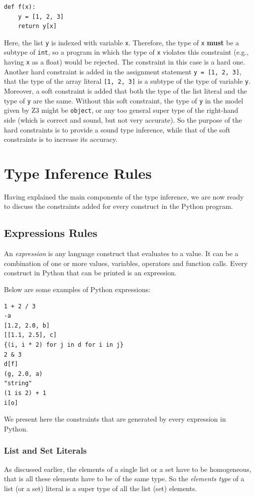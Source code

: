 \begin{lstlisting}
def f(x):
	y = [1, 2, 3]
	return y[x]
\end{lstlisting}

Here, the list \lstinline|y| is indexed with variable \lstinline|x|. Therefore, the type of \lstinline|x| \textbf{must} be a subtype of \lstinline|int|, so a program in which the type of \lstinline|x| violates this constraint (e.g., having \lstinline|x| as a float) would be rejected. The constraint in this case is a hard one. Another hard constraint is added in the assignment statement \lstinline|y = [1, 2, 3]|, that the type of the array literal \lstinline|[1, 2, 3]| is a subtype of the type of variable \lstinline|y|. Moreover, a soft constraint is added that both the type of the list literal and the type of \lstinline|y| are the same. Without this soft constraint, the type of \lstinline|y| in the model given by Z3 might be \lstinline|object|, or any too general super type of the right-hand side (which is correct and sound, but not very accurate). So the purpose of the hard constraints is to provide a sound type inference, while that of the soft constraints is to increase its accuracy.
\section{Type Inference Rules}\label{sec:rules}
Having explained the main components of the type inference, we are now ready to discuss the constraints added for every construct in the Python program.
\subsection{Expressions Rules}
An \textit{expression} is any language construct that evaluates to a value. It can be a combination of one or more values, variables, operators and function calls. Every construct in Python that can be printed is an expression.

Below are some examples of Python expressions:
\begin{lstlisting}
1 + 2 / 3
-a
[1.2, 2.0, b]
[[1.1, 2.5], c]
{(i, i * 2) for j in d for i in j}
2 & 3
d[f]
(g, 2.0, a)
"string"
(1 is 2) + 1
i[o]
\end{lstlisting}

We present here the constraints that are generated by every expression in Python.

\subsubsection{List and Set Literals}
As discussed earlier, the elements of a single list or a set have to be homogeneous, that is all these elements have to be of the same type. So the \textit{elements type} of a list (or a set) literal is a super type of all the list (set) elements.

